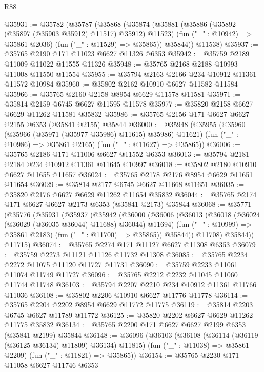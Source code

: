 \begin{lexlean}{R88}
\begin{coremodule}
@35931 := @35782
    (@35787
      (@35868
        (@35874
          (@35881
            (@35886 (@35892 (@35897 (@35903 @35912) @11517) @35912) @11523)
            (fun ("_" : @10942) => @35861 @2036)
            (fun ("_" : @11529) => @35865))
          @35844))
      @11538)
@35937 := @35765 @2190 @171 @11023 @6627 @11326 @6353
@35942 := @35759 @2189 @11009 @11022 @11555 @11326
@35948 := @35765 @2168 @2188 @10993 @11008 @11550 @11554
@35955 := @35794 @2163 @2166 @234 @10912 @11361 @11572 @10984
@35960 := @35802 @2162 @10910 @6627 @11582 @11584
@35966 := @35765 @2160 @2158 @8954 @6629 @11578 @11581
@35971 := @35814 @2159 @6745 @6627 @11595 @11578
@35977 := @35820 @2158 @6627 @6629 @11262 @11581 @35832
@35986 := @35765 @2156 @171 @6627 @6627 @2155 @6353 (@35841 @2155) @35844
@36000 := @35948
    (@35955
      (@35960 (@35966 (@35971 (@35977 @35986) @11615) @35986) @11621)
      (fun ("_" : @10986) => @35861 @2165)
      (fun ("_" : @11627) => @35865))
@36006 := @35765 @2186 @171 @11006 @6627 @11552 @6353
@36013 := @35794 @2181 @2184 @234 @10912 @11361 @11645 @10997
@36018 := @35802 @2180 @10910 @6627 @11655 @11657
@36024 := @35765 @2178 @2176 @8954 @6629 @11651 @11654
@36029 := @35814 @2177 @6745 @6627 @11668 @11651
@36035 := @35820 @2176 @6627 @6629 @11262 @11654 @35832
@36044 := @35765 @2174 @171 @6627 @6627 @2173 @6353 (@35841 @2173) @35844
@36068 := @35771
    (@35776
      (@35931
        (@35937
          (@35942
            (@36000
              (@36006
                (@36013
                  (@36018 (@36024 (@36029 (@36035 @36044) @11688) @36044) @11694)
                  (fun ("_" : @10999) => @35861 @2183)
                  (fun ("_" : @11700) => @35865))
                @35844))
            @11708)
          @35844))
      @11715)
@36074 := @35765 @2274 @171 @11127 @6627 @11308 @6353
@36079 := @35759 @2273 @11121 @11126 @11732 @11308
@36085 := @35765 @2234 @2272 @11075 @11120 @11727 @11731
@36090 := @35759 @2233 @11061 @11074 @11749 @11727
@36096 := @35765 @2212 @2232 @11045 @11060 @11744 @11748
@36103 := @35794 @2207 @2210 @234 @10912 @11361 @11766 @11036
@36108 := @35802 @2206 @10910 @6627 @11776 @11778
@36114 := @35765 @2204 @2202 @8954 @6629 @11772 @11775
@36119 := @35814 @2203 @6745 @6627 @11789 @11772
@36125 := @35820 @2202 @6627 @6629 @11262 @11775 @35832
@36134 := @35765 @2200 @171 @6627 @6627 @2199 @6353 (@35841 @2199) @35844
@36148 := @36096
    (@36103
      (@36108 (@36114 (@36119 (@36125 @36134) @11809) @36134) @11815)
      (fun ("_" : @11038) => @35861 @2209)
      (fun ("_" : @11821) => @35865))
@36154 := @35765 @2230 @171 @11058 @6627 @11746 @6353

\end{coremodule}
\end{lexlean}
